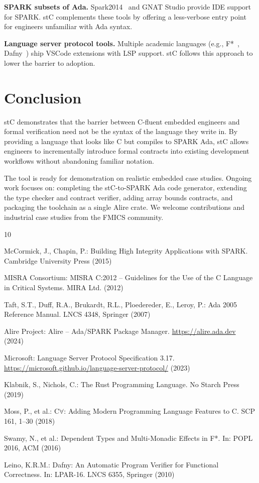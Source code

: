\documentclass[runningheads]{llncs}
\begin{document}
\textbf{SPARK subsets of Ada.} Spark2014~\cite{SparkAda} and GNAT Studio
provide IDE support for SPARK. stC complements these tools by offering a
less-verbose entry point for engineers unfamiliar with Ada syntax.

\textbf{Language server protocol tools.} Multiple academic languages
(e.g., F*~\cite{fstar}, Dafny~\cite{dafny}) ship VSCode extensions with
LSP support. stC follows this approach to lower the barrier to adoption.

\section{Conclusion}
\label{sec:conclusion}

stC demonstrates that the barrier between C-fluent embedded engineers
and formal verification need not be the syntax of the language they write in.
By providing a language that looks like C but compiles to SPARK Ada, stC
allows engineers to incrementally introduce formal contracts into existing
development workflows without abandoning familiar notation.

The tool is ready for demonstration on realistic embedded case studies.
Ongoing work focuses on: completing the stC-to-SPARK Ada code generator,
extending the type checker and contract verifier, adding array bounds
contracts, and packaging the toolchain as a single Alire crate.
We welcome contributions and industrial case studies from the FMICS community.

\begin{thebibliography}{10}

McCormick, J., Chapin, P.: Building High Integrity Applications with SPARK.
Cambridge University Press (2015)

MISRA Consortium: MISRA C:2012 -- Guidelines for the Use of the C Language
in Critical Systems. MIRA Ltd. (2012)

Taft, S.T., Duff, R.A., Brukardt, R.L., Ploedereder, E., Leroy, P.:
Ada 2005 Reference Manual. LNCS 4348, Springer (2007)

Alire Project: Alire -- Ada/SPARK Package Manager.
\url{https://alire.ada.dev} (2024)

Microsoft: Language Server Protocol Specification 3.17.
\url{https://microsoft.github.io/language-server-protocol/} (2023)

Klabnik, S., Nichols, C.: The Rust Programming Language.
No Starch Press (2019)

Moss, P., et al.: C$\forall$: Adding Modern Programming Language Features to C.
SCP 161, 1--30 (2018)

Swamy, N., et al.: Dependent Types and Multi-Monadic Effects in F*.
In: POPL 2016, ACM (2016)

Leino, K.R.M.: Dafny: An Automatic Program Verifier for Functional Correctness.
In: LPAR-16. LNCS 6355, Springer (2010)

\end{thebibliography}
\end{document}
